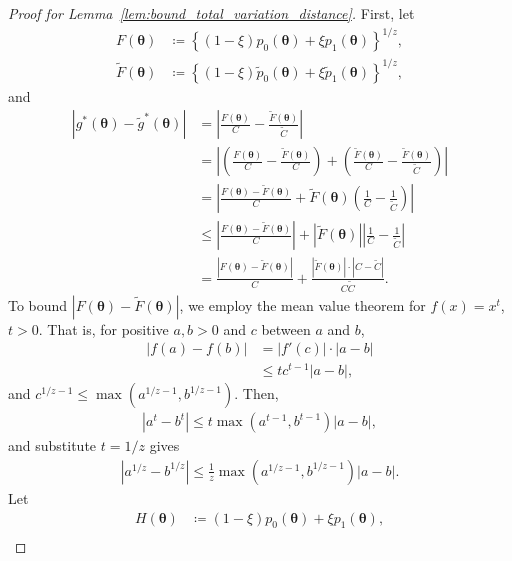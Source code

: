 \documentclass[10pt,a4paper]{amsart}
\begin{document}
\begin{proof}[Proof for Lemma~\ref{lem:bound_total_variation_distance}]
    First, let
    \begin{align*}
        F(\bm{\theta}) &\coloneqq \left\{(1 - \xi) p_0(\bm{\theta}) + \xi p_1(\bm{\theta}) \right\}^{1 / z}, \\
        \tilde{F}(\bm{\theta}) &\coloneqq \left\{(1 - \xi) \tilde{p}_0(\bm{\theta}) + \xi \tilde{p}_1(\bm{\theta}) \right\}^{1 / z},
    \end{align*}
    and
    \begin{align*}
        \left|g^*(\bm{\theta}) - \tilde{g}^*(\bm{\theta})\right| &= \left|\frac{F(\bm{\theta})}{C} - \frac{\tilde{F}(\bm{\theta})}{\tilde{C}}\right| \\
        &= \left| \left(\frac{F(\bm{\theta})}{C} - \frac{\tilde{F}(\bm{\theta})}{C}\right) + \left(\frac{\tilde{F}(\bm{\theta})}{C} - \frac{\tilde{F}(\bm{\theta})}{\tilde{C}}\right)\right| \\
        &= \left| \frac{F(\bm{\theta}) - \tilde{F}(\bm{\theta})}{C} + \tilde{F}(\bm{\theta})\left(\frac{1}{C} - \frac{1}{\tilde{C}}\right) \right| \\
        &\leq \left| \frac{F(\bm{\theta}) - \tilde{F}(\bm{\theta})}{C} \right| + \left| \tilde{F}(\bm{\theta}) \right| \left| \frac{1}{C} - \frac{1}{\tilde{C}} \right| \\
        &= \frac{\left| F(\bm{\theta}) - \tilde{F}(\bm{\theta}) \right|}{C} + \frac{|\tilde{F}(\bm{\theta})| \cdot |C - \tilde{C}|}{C \tilde{C}}.
    \end{align*}
    To bound $\left|F(\bm{\theta}) - \tilde{F}(\bm{\theta})\right|$, we employ the mean value theorem for $f(x) = x^{t}$, $t > 0$.
    That is, for positive $a, b > 0$ and $c$ between $a$ and $b$,
    \begin{align*}
        |f(a) - f(b)| &= |f'(c)| \cdot |a - b| \\
        &\leq t c^{t - 1} |a - b|,
    \end{align*}
    and $c^{1 / z - 1} \leq \max(a^{1 / z - 1}, b^{1 / z - 1})$.
    Then,
    \begin{align*}
        \left|a^{t} - b^{t}\right| \leq t \max\left(a^{t - 1}, b^{t - 1}\right) |a - b|,
    \end{align*}
    and substitute $t = 1/z$ gives
    \begin{align*}
        \left|a^{1/z} - b^{1/z}\right| \leq \frac{1}{z} \max\left(a^{1/z - 1}, b^{1/z - 1}\right) |a - b|.
    \end{align*}
    Let
    \begin{align*}
        H(\bm{\theta}) &\coloneqq (1 - \xi) p_0(\bm{\theta}) + \xi p_1(\bm{\theta}), \\

\end{align*}
\end{proof}
\end{document}
